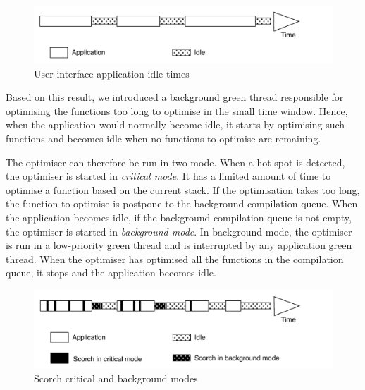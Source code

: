 \documentclass[a4paper,12pt,twoside]{../includes/ThesisStyle}
\begin{document}
\begin{figure}[h!]
    \begin{center}
        \includegraphics[width=0.9\linewidth]{ApplicationIdle}
        \caption{User interface application idle times}
        \label{fig:ApplicationIdle}
    \end{center}
\end{figure}

Based on this result, we introduced a background green thread responsible for optimising the functions too long to optimise in the small time window. Hence, when the application would normally become idle, it starts by optimising such functions and becomes idle when no functions to optimise are remaining.

The optimiser can therefore be run in two mode. When a hot spot is detected, the optimiser is started in \emph{critical mode}. It has a limited amount of time to optimise a function based on the current stack. If the optimisation takes too long, the function to optimise is postpone to the background compilation queue. When the application becomes idle, if the background compilation queue is not empty, the optimiser is started in \emph{background mode}. In background mode, the optimiser is run in a low-priority green thread and is interrupted by any application green thread. When the optimiser has optimised all the functions in the compilation queue, it stops and the application becomes idle.

\begin{figure}[h!]
    \begin{center}
        \includegraphics[width=0.9\linewidth]{ScorchModes}
        \caption{Scorch critical and background modes}
        \label{fig:ScorchModes}
    \end{center}
\end{figure}
\end{document}

